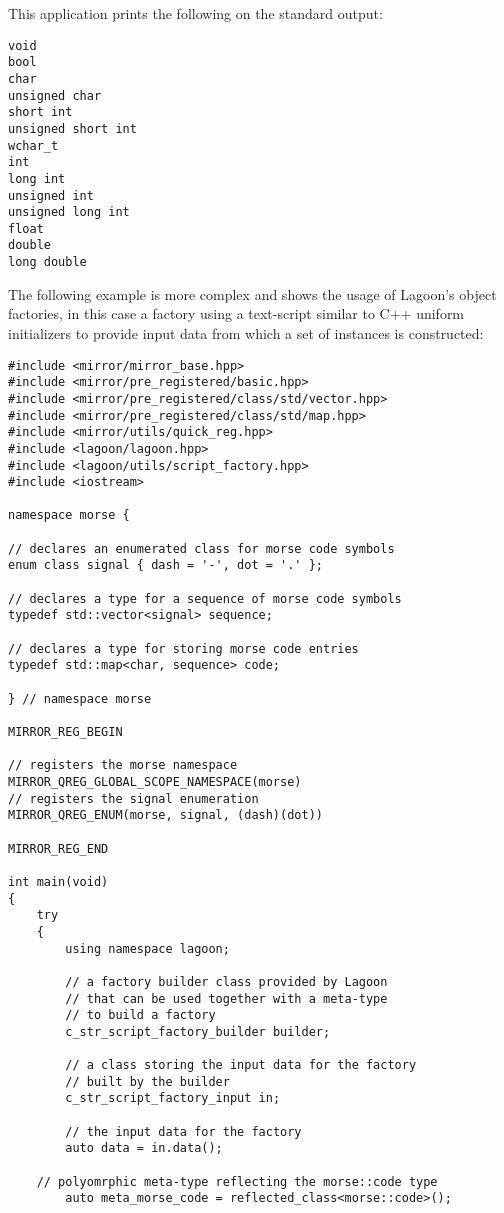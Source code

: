 This application prints the following on the standard output:

\begin{verbatim}
void
bool
char
unsigned char
short int
unsigned short int
wchar_t
int
long int
unsigned int
unsigned long int
float
double
long double
\end{verbatim}

The following example is more complex and shows the usage of Lagoon's
object factories, in this case a factory using a text-script similar
to C++ uniform initializers to provide input data from which a set
of instances is constructed:

\begin{lstlisting}
#include <mirror/mirror_base.hpp>
#include <mirror/pre_registered/basic.hpp>
#include <mirror/pre_registered/class/std/vector.hpp>
#include <mirror/pre_registered/class/std/map.hpp>
#include <mirror/utils/quick_reg.hpp>
#include <lagoon/lagoon.hpp>
#include <lagoon/utils/script_factory.hpp>
#include <iostream>

namespace morse {

// declares an enumerated class for morse code symbols
enum class signal { dash = '-', dot = '.' };

// declares a type for a sequence of morse code symbols
typedef std::vector<signal> sequence;

// declares a type for storing morse code entries
typedef std::map<char, sequence> code;

} // namespace morse

MIRROR_REG_BEGIN

// registers the morse namespace
MIRROR_QREG_GLOBAL_SCOPE_NAMESPACE(morse)
// registers the signal enumeration
MIRROR_QREG_ENUM(morse, signal, (dash)(dot))

MIRROR_REG_END

int main(void)
{
    try
    {
        using namespace lagoon;

        // a factory builder class provided by Lagoon
        // that can be used together with a meta-type
        // to build a factory
        c_str_script_factory_builder builder;

        // a class storing the input data for the factory
        // built by the builder
        c_str_script_factory_input in;

        // the input data for the factory
        auto data = in.data();

    // polyomrphic meta-type reflecting the morse::code type
        auto meta_morse_code = reflected_class<morse::code>();


\end{lstlisting}
